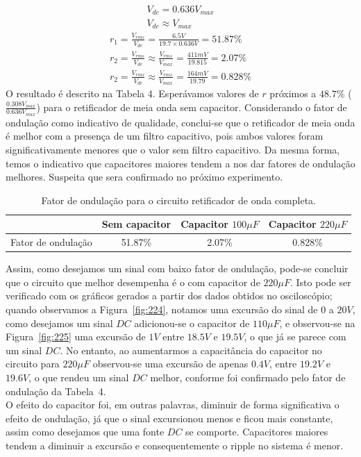 \documentclass[12pt,a4paper]{article}
\begin{document}
 \begin{align}
   \label{eq:ondacompleta}
   V_{dc}  =0.636 V_{max}  \\
   \label{eq:ondacompletacapacitor}
   V_{dc} \approx V_{max}
 \end{align}
\begin{align}
  r_1 = \frac{V_{rms}}{V_{dc}}= \frac{6.5 V}{19.7 \times 0.636 V}= 51.87\%\\
  r_2= \frac{V_{rms}}{V_{dc}} \approx \frac{V_{rms}}{V_{max}} = \frac{411 mV}{19.815}= 2.07 \% \\
  r_2= \frac{V_{rms}}{V_{dc}} \approx \frac{V_{rms}}{V_{max}} = \frac{164 mV}{19.79}= 0.828 \%
\end{align}
O resultado é descrito na Tabela 4. Esperávamos valores de $r$ próximos a $48.7\%$ ($\frac{0.308 V_{max}}{0.636 V_{max}}$) para o retificador de meia onda sem capacitor. Considerando o fator de ondulação como indicativo de qualidade, conclui-se que o retificador de meia onda é melhor com a presença de um filtro capacitivo, pois ambos valores foram significativamente menores que o valor sem filtro capacitivo. Da mesma forma, temos o indicativo que capacitores maiores tendem a nos dar fatores de ondulação melhores. Suspeita que sera confirmado no próximo experimento. 
    \begin{table}[htpb]
        \centering
        \caption{Fator de ondulação para o circuito retificador de onda completa.}
        \begin{tabular}{l c c c}
        \toprule
        & Sem capacitor & Capacitor $100 \mu F$ & Capacitor $220 \mu F$ \\ \midrule
        \multicolumn{1}{c}{Fator de ondulação} & 51.87\%       &  2.07\%  &  0.828\%                \\ \bottomrule
        \end{tabular}
        \end{table}

        Assim, como desejamos um sinal com baixo fator de ondulação, pode-se concluir que o circuito que melhor desempenha é o com capacitor de $220 \mu F$. Isto pode ser verificado com os gráficos gerados a partir dos dados obtidos no osciloscópio; quando observamos a Figura~\ref{fig:224}, notamos uma excursão do sinal de $0$ a $20V$, como desejamos um sinal $DC$ adicionou-se o capacitor de $110 \mu F$, e observou-se na Figura~\ref{fig:225} uma excursão de $1V$ entre $18.5 V$ e $19.5 V$, o que já se parece com um sinal $DC$. No entanto, ao aumentarmos a capacitância do capacitor no circuito para $220 \mu F$ observou-se uma excursão de apenas $0.4 V$, entre $19.2 V$ e $19.6V$, o que rendeu um sinal $DC$ melhor, conforme foi confirmado pelo fator de ondulação da Tabela~4. \\
        O efeito do capacitor foi, em outras palavras, diminuir de forma significativa o efeito de ondulação, já que o sinal excursionou menos e ficou mais constante, assim como desejamos que uma fonte $DC$ se comporte. Capacitores maiores tendem a diminuir a excursão e consequentemente o ripple no sistema é menor.
\end{document}
